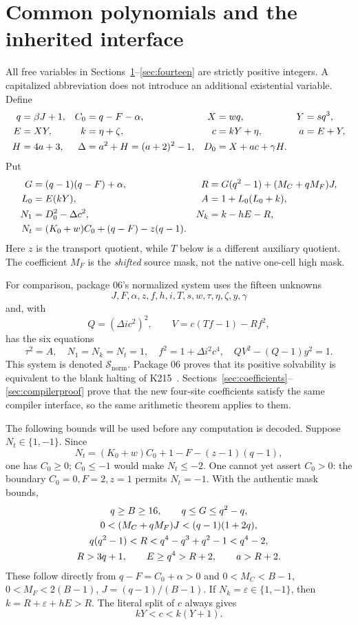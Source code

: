 \documentclass[11pt,a4paper]{article}
\theoremstyle{remark}\newtheorem{remark}[theorem]{Remark}
\newcommand{\Parent}{\mathcal S_{\mathrm{norm}}}
\begin{document}
\section{Common polynomials and the inherited interface}
\label{sec:common}

All free variables in Sections~\ref{sec:common}--\ref{sec:fourteen} are
strictly positive integers. A capitalized abbreviation does not introduce
an additional existential variable. Define
\begin{align}
 q&=\beta J+1,& C_0&=q-F-\alpha,&X&=wq,&Y&=sq^3,\notag\\
 E&=XY,& k&=\eta+\zeta,&c&=kY+\eta,&a&=E+Y,\notag\\
 H&=4a+3,&\Delta&=a^2+H=(a+2)^2-1,&
 D_0&=X+ac+\gamma H. \label{eq:common}
\end{align}
Put
\begin{align}
 G&=(q-1)(q-F)+\alpha,&
 R&=G(q^2-1)+(M_C+qM_F)J,\notag\\
 L_0&=E(kY),& A&=1+L_0(L_0+k), \label{eq:pack}\\
 N_1&=D_0^2-\Delta c^2,&
 N_k&=k-hE-R,\notag\\
 N_t&=(K_0+w)C_0+(q-F)-z(q-1). \label{eq:units}
\end{align}
Here $z$ is the transport quotient, while $T$ below is a different
auxiliary quotient. The coefficient $M_F$ is the \emph{shifted} source
mask, not the native one-cell high mask.

For comparison, package 06's normalized system uses the fifteen
unknowns
\[
 J,F,\alpha,z,f,h,i,T,s,w,\tau,\eta,\zeta,y,\gamma
\]
and, with
\[
 Q=(\Delta i c^2)^2,\qquad V=c(Tf-1)-Rf^2,
\]
has the six equations
\begin{equation}
 \tau^2=A,\quad N_1=N_k=N_t=1,\quad
 f^2=1+\Delta i^2c^4,\quad
 QV^2-(Q-1)y^2=1. \label{eq:normalized}
\end{equation}
This system is denoted $\Parent$. Package 06 proves that its positive
solvability is equivalent to the blank halting of K215~\cite{blank}.
Sections~\ref{sec:coefficients}--\ref{sec:compilerproof} prove that the
new four-site coefficients satisfy the same compiler interface, so the
same arithmetic theorem applies to them.

The following bounds will be used before any computation is decoded.
Suppose $N_t\in\{1,-1\}$. Since
\[
 N_t=(K_0+w)C_0+1-F-(z-1)(q-1),
\]
one has $C_0\ge0$; $C_0\le-1$ would make $N_t\le-2$.
One cannot yet assert $C_0>0$: the boundary
$C_0=0,F=2,z=1$ permits $N_t=-1$. With the authentic mask bounds,
\begin{gather}
 q\ge B\ge16,\qquad q\le G\le q^2-q,\notag\\
 0<(M_C+qM_F)J<(q-1)(1+2q),\notag\\
 q(q^2-1)<R<q^4-q^3+q^2-1<q^4-2,\label{eq:weakbounds}\\
 R>3q+1,\qquad E\ge q^4>R+2,\qquad a>R+2.\notag
\end{gather}
These follow directly from $q-F=C_0+\alpha>0$ and
$0<M_C<B-1$, $0<M_F<2(B-1)$, $J=(q-1)/(B-1)$.
If $N_k=\varepsilon\in\{1,-1\}$, then
$k=R+\varepsilon+hE>R$. The literal split of $c$ always gives
\begin{equation}
 kY<c<k(Y+1). \label{eq:ratio}
\end{equation}
\end{document}
